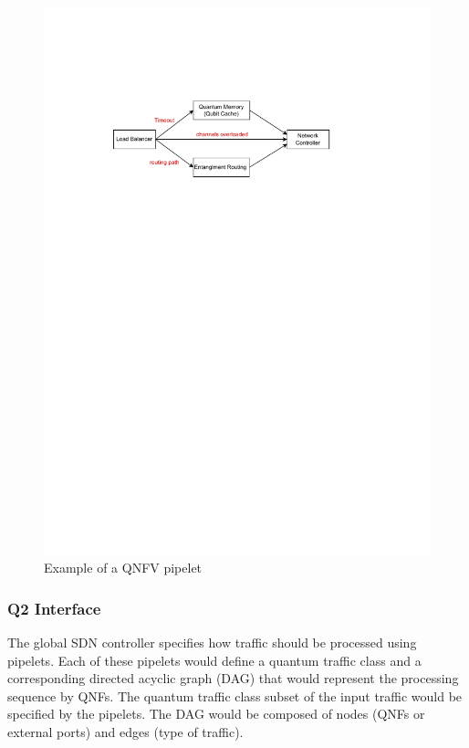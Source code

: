 \documentclass[sigplan,screen]{acmart}
\begin{document}
\begin{figure}[H]
     \centering
     \includegraphics[width=1\linewidth]{images/pip.pdf}
     \caption{Example of a QNFV pipelet}
     \label{fig:future}
\end{figure}

\subsubsection{Q2 Interface} The global SDN controller specifies how traffic should be processed using pipelets. Each of these pipelets would define a quantum traffic class and a corresponding directed acyclic graph (DAG) that would represent the processing sequence by QNFs. The quantum traffic class subset of the input traffic would be specified by the pipelets. The DAG would be composed of nodes (QNFs or external ports) and edges (type of traffic).
\end{document}
